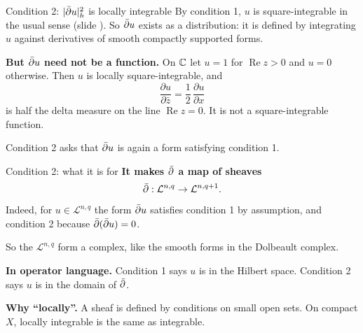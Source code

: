\begin{frame}{Condition 2: \(|\bar\partial u|_h^2\) is locally integrable}
\label{fr:l2-second}
By condition 1, \(u\) is square-integrable in the usual sense (slide \hyperlink{fr:l2-first}{\pageref{fr:l2-first}}). So \(\bar\partial u\) exists as a distribution: it is defined by integrating \(u\) against derivatives of smooth compactly supported forms.
\par\medskip
\textbf{But \(\bar\partial u\) need not be a function.} On \(\mathbb C\) let \(u=1\) for \(\operatorname{Re}z>0\) and \(u=0\) otherwise. Then \(u\) is locally square-integrable, and
\[
\frac{\partial u}{\partial\bar z}=\frac12\,\frac{\partial u}{\partial x}
\]
is half the delta measure on the line \(\operatorname{Re}z=0\). It is not a square-integrable function.
\par\medskip
Condition 2 asks that \(\bar\partial u\) is again a form satisfying condition 1.
\src{\textcolor{red}{I did not verify this slide.}}
\end{frame}

\begin{frame}{Condition 2: what it is for}
\label{fr:l2-second-gives}
\textbf{It makes \(\bar\partial\) a map of sheaves}
\[
\bar\partial:\mathcal L^{n,q}\to\mathcal L^{n,q+1}.
\]
Indeed, for \(u\in\mathcal L^{n,q}\) the form \(\bar\partial u\) satisfies condition 1 by assumption, and condition 2 because \(\bar\partial(\bar\partial u)=0\).
\par\medskip
So the \(\mathcal L^{n,q}\) form a complex, like the smooth forms in the Dolbeault complex.
\par\medskip
\textbf{In operator language.} Condition 1 says \(u\) is in the Hilbert space. Condition 2 says \(u\) is in the domain of \(\bar\partial\).
\par\medskip
\textbf{Why ``locally''.} A sheaf is defined by conditions on small open sets. On compact \(X\), locally integrable is the same as integrable.
\end{frame}

